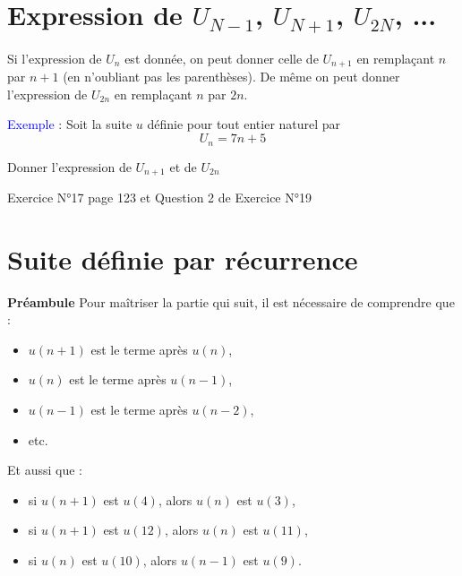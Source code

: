 \documentclass[a4paper,12pt]{article}
\begin{document}
\section*{Expression de $U_{N-1}$, $U_{N+1}$, $U_{2N}$, ...}

Si l’expression de $U_n$ est donnée, on peut donner celle de $U_{n+1}$ en remplaçant $n$ par $n + 1$ (en n'oubliant pas les parenthèses).
De même on peut donner l’expression de $U_{2n}$ en remplaçant $n$ par $2n$. \par
\vspace{1em}
\textcolor{blue}{Exemple} : Soit la suite $u$ définie pour tout entier naturel par
\[
  U_n = 7n + 5
\] \par

Donner l’expression de $U_{n+1}$ et de $U_{2n}$

\trou{\vspace{5em}}{\vspace{5em}}

\begin{tcolorbox}[colback=blue!10!white, colframe=blue!75!black, title=Exercices]
  Exercice N°17 page 123 et Question 2 de Exercice N°19
\end{tcolorbox}

\section*{Suite définie par récurrence}

\textbf{Préambule}
\vspace{1em}
Pour maîtriser la partie qui suit, il est nécessaire de comprendre que : 
\begin{itemize}[noitemsep]
    \item $u(n+1)$ est le terme après $u(n)$,
    \item $u(n)$ est le terme après $u(n-1)$,
    \item $u(n-1)$ est le terme après $u(n-2)$,
    \item etc.
\end{itemize}

Et aussi que :
\begin{itemize}[noitemsep]
    \item si $u(n+1)$ est $u(4)$, alors $u(n)$ est $u(3)$,
    \item si $u(n+1)$ est $u(12)$, alors $u(n)$ est $u(11)$,
    \item si $u(n)$ est $u(10)$, alors $u(n-1)$ est $u(9)$.
\end{itemize}
\end{document}
